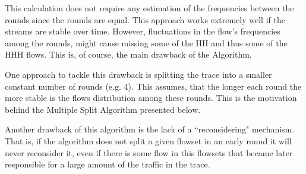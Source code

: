 This calculation does not require any estimation of the frequencies between the rounds since the rounds are equal. This approach works extremely well if the streams are stable over time.  However,  fluctuations in the flow's frequencies among the rounds, might cause missing some of the HH and thus some of the HHH flows. This is, of course, the main drawback of the \simpleAlgo Algorithm.

One approach to tackle this drawback is splitting the trace into a smaller constant number of rounds (e.g. 4). This assumes, that the longer each round the more stable is the flows distribution among these rounds. This is the motivation behind the Multiple Split Algorithm presented below.

Another drawback of this algorithm is the lack of a ``reconsidering" mechanism. That is, if the algorithm does not split a given flowset in an early round it will never reconsider it, even if there is some flow in this flowsets that became later responsible for a large amount of the traffic in the trace.


